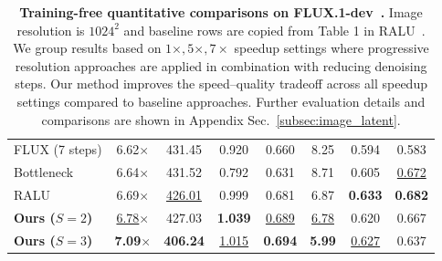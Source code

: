 \begin{table}[!t]
\begin{tabular*}{\textwidth}{@{\extracolsep{\fill}} l ccccccc @{}}
    \midrule[0.3pt]
    FLUX (7 steps) & 6.62$\times$ & 431.45 & 0.920 & 0.660 & 8.25 & 0.594 & 0.583 \\
    Bottleneck~\citep{bottleneck} & 6.64$\times$              & 431.52              & 0.792          & 0.631             & 8.71          & 0.605             & \underline{0.672} \\
    RALU~\citep{ralu}             & 6.69$\times$              & \underline{426.01}  & 0.999          & 0.681             & 6.87          & \textbf{0.633}    & \textbf{0.682}    \\
    \textbf{Ours ($S=2$)}         & \underline{6.78}$\times$  & 427.03              & \textbf{1.039} & \underline{0.689} & \underline{6.78} & 0.620          & 0.667             \\
    \textbf{Ours ($S=3$)}         & \textbf{7.09}$\times$     & \textbf{406.24}     & \underline{1.015} & \textbf{0.694} & \textbf{5.99} & \underline{0.627} & 0.637             \\
    \bottomrule
  \end{tabular*}
  \vspace{-2pt} 
  \caption{\textbf{Training-free quantitative comparisons on FLUX.1-dev~\citep{black2024flux}.} Image resolution is $1024^2$ and baseline rows are copied from Table 1 in RALU~\citep{ralu}. We group results based on $1\times, 5\times, 7\times$ speedup settings where progressive resolution approaches are applied in combination with reducing denoising steps. Our method improves the speed--quality tradeoff across all speedup settings compared to baseline approaches. Further evaluation details and comparisons are shown in Appendix Sec.~\ref{subsec:image_latent}.}
  \label{tab:flux-main}
\end{table}
